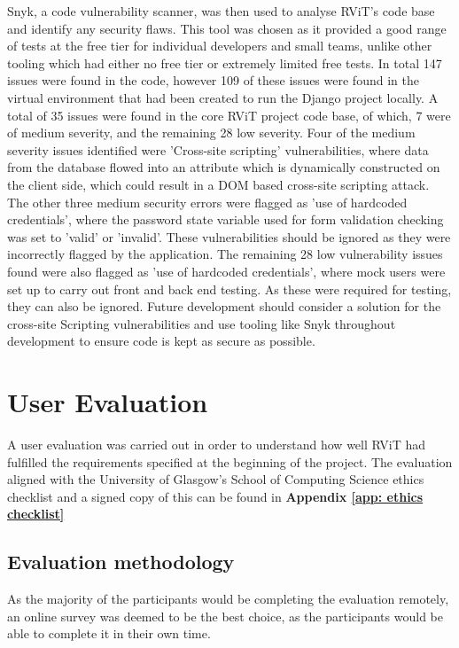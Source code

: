 \documentclass[l4proj.tex]{subfiles}
\begin{document}
Snyk, a code vulnerability scanner, was then used to analyse RViT's code base and identify any security flaws. This tool was chosen as it provided a good range of tests at the free tier for individual developers and small teams, unlike other tooling which had either no free tier or extremely limited free tests. In total 147 issues were found in the code, however 109 of these issues were found in the virtual environment that had been created to run the Django project locally. A total of 35 issues were found in the core RViT project code base, of which, 7 were of medium severity, and the remaining 28 low severity. Four of the medium severity issues identified were 'Cross-site scripting' vulnerabilities, where data from the database flowed into an attribute which is dynamically constructed on the client side, which could result in a DOM based cross-site scripting attack. The other three medium security errors were flagged as 'use of hardcoded credentials', where the password state variable used for form validation checking was set to 'valid' or 'invalid'. These vulnerabilities should be ignored as they were incorrectly flagged by the application. The remaining 28 low vulnerability issues found were also flagged as 'use of hardcoded credentials', where mock users were set up to carry out front and back end testing. As these were required for testing, they can also be ignored. Future development should consider a solution for the cross-site Scripting vulnerabilities and use tooling like Snyk throughout development to ensure code is kept as secure as possible.


\section{User Evaluation}
A user evaluation was carried out in order to understand how well RViT had fulfilled the requirements specified at the beginning of the project. The evaluation aligned with the University of Glasgow's School of Computing Science ethics checklist and a signed copy of this can be found in \textbf{Appendix \ref{app: ethics checklist}}


\subsection{Evaluation methodology}
As the majority of the participants would be completing the evaluation remotely, an online survey was deemed to be the best choice, as the participants would be able to complete it in their own time.
\end{document}

